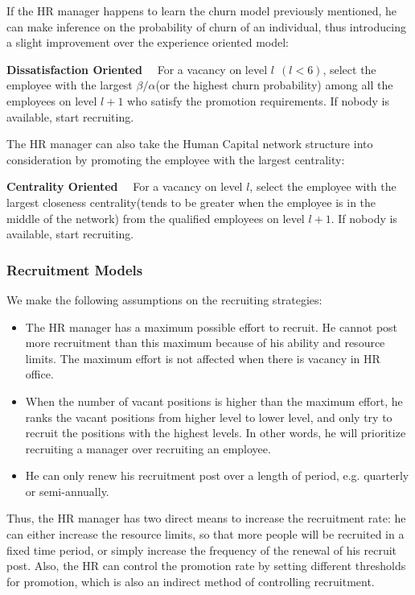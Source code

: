 \documentclass[tcn = 37075, sheet = false, abstract = false]{mcmthesis}
\begin{document}
	If the HR manager happens to learn the churn model previously mentioned, he can make inference on the probability of churn of an individual, thus introducing a slight improvement over the experience oriented model:
	
	
	\noindent \textbf{Dissatisfaction Oriented} \ \  For a vacancy on level $l ~~ (l < 6)$, select the employee with the largest $\beta / \alpha$(or the highest churn probability) among all the employees on level $l+1$ who satisfy the promotion requirements. If nobody is available, start recruiting.
	
	The HR manager can also take the Human Capital network structure into consideration by promoting the employee with the largest centrality: 
	
	
	\noindent \textbf{Centrality Oriented} \ \ For a vacancy on level $l$, select the employee with the largest closeness centrality(tends to be greater when the employee is in the middle of the network) from the qualified employees on level $l+1$. If nobody is available, start recruiting.
	
	
	\subsubsection{Recruitment Models}
	We make the following assumptions on the recruiting strategies:
	\begin{itemize}
		\item The HR manager has a maximum possible effort to recruit. He cannot post more recruitment than this maximum because of his ability and resource limits. The maximum effort is not affected when there is vacancy in HR office. 
		\item When the number of vacant positions is higher than the maximum effort, he ranks the vacant positions from higher level to lower level, and only try to recruit the positions with the highest levels. In other words, he will prioritize recruiting a manager over recruiting an employee. 
		\item He can only renew his recruitment post over a length of period, e.g. quarterly or semi-annually.
	\end{itemize}
	
	Thus, the HR manager has two direct means to increase the recruitment rate: he can either increase the resource limits, so that more people will be recruited in a fixed time period, or simply increase the frequency of the renewal of his recruit post. Also, the HR can control the promotion rate by setting different thresholds for promotion, which is also an indirect method of controlling recruitment. 
	
\end{document}
